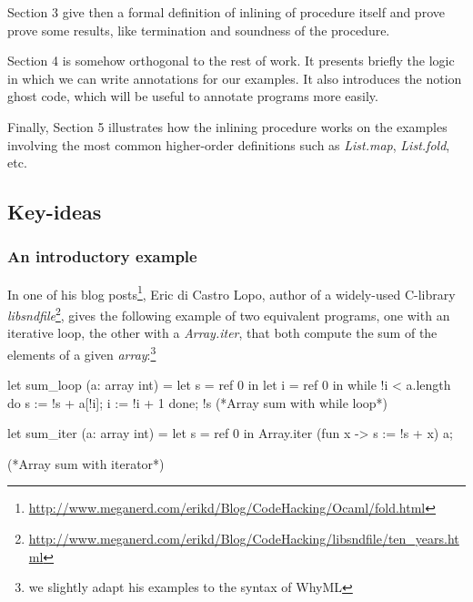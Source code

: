 \documentclass[a4paper,11pt,oneside]{article}
\theoremstyle{plain}
\newcommand{\inlsrc}{\textit{ML}^{^2}}
\newcommand{\meganerd}	
	{\url{http://www.meganerd.com/erikd/Blog/CodeHacking/Ocaml/fold.html}}
\newcommand{\libsndfile}
{\url{
http://www.meganerd.com/erikd/Blog/CodeHacking/libsndfile/ten_years.html}}
\begin{document}
   


	Section 3 give then a formal definition of inlining of procedure itself and prove 
	prove some results, like termination and soundness of the procedure. 


	Section 4 is somehow orthogonal to the rest of work. It presents briefly the logic in which we can write annotations for our examples. It also introduces the notion ghost code, which will be useful to annotate programs more easily. 
	
	 Finally, Section 5 illustrates how the inlining procedure works on the examples involving the most common higher-order definitions such as \textit{List.map}, \textit{List.fold}, etc. 
	
 
  
	
\subsection{Key-ideas}		

\subsubsection*{An introductory example}			
	
	In one of his blog posts\footnote{\meganerd}, Eric di Castro Lopo, author of a widely-used C-library \textit{libsndfile}\footnote{\libsndfile}, gives the following example of two equivalent programs, one with an iterative loop, the other with a \textit{Array.iter}, that both compute the sum of the elements of a given \textit{array}:\vspace{-0.5cm}\footnote{we slightly adapt his examples to the syntax of WhyML} 

\begin{small}
	\begin{minipage}[t]{0.4\linewidth}
		\begin{whycode}  
 let sum_loop (a: array int) =		
  let s = ref 0 in
  let i = ref 0 in
  while !i < a.length do
    s := !s + a[!i];
    i := !i + 1
  done; !s 
 (*Array sum with while loop*)
		\end{whycode}
	\end{minipage}\hfill 
	\begin{minipage}[t]{0.51\linewidth}
		\begin{whycode} 
  let sum_iter (a: array int) =		 
    let s = ref 0 in
    Array.iter (fun x -> s := !s + x) a;



 
    (*Array sum with iterator*)
		\end{whycode}	
	\end{minipage}
\end{small}
\end{document}
